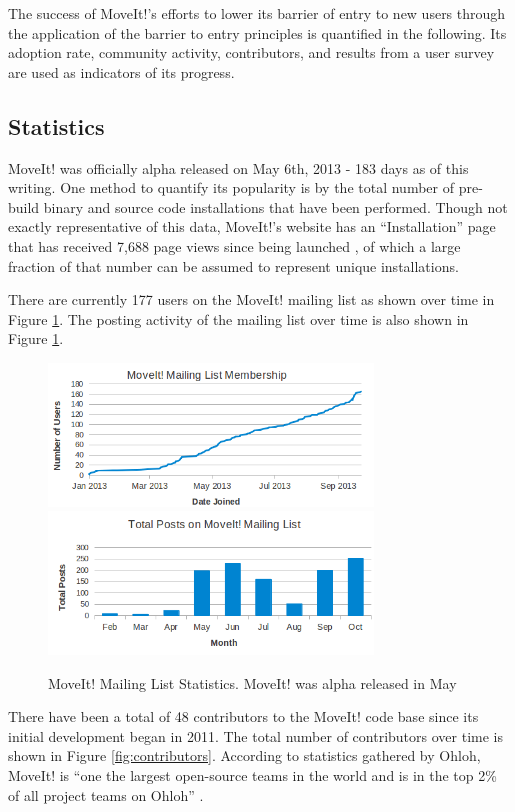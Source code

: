 \documentclass[10pt,journal,compsoc]{joser1}
\begin{document}
{The success of MoveIt!'s efforts to lower its barrier of entry to new users through the application of the barrier to entry principles is quantified in the following. Its adoption rate, community activity, contributors, and results from a user survey are used as indicators of its progress.

\subsection{Statistics}
\label{sec::statistics}

MoveIt! was officially alpha released on May 6th, 2013 - 183 days as of this writing. One method to quantify its popularity is by the total number of pre-build binary and source code installations that have been performed. Though not exactly representative of this data, MoveIt!'s website has an ``Installation'' page that has received 7,688 page views since being launched \cite{moveit}, of which a large fraction of that number can be assumed to represent unique installations. 

There are currently 177 users on the MoveIt! mailing list as shown over time in Figure \ref{fig:membership_plot}. The posting activity of the mailing list over time is also shown in Figure \ref{fig:membership_plot}.

\begin{figure}[!t]
\centering
\includegraphics[width=3.4in]{images/membership_plot}
\includegraphics[width=3.4in]{images/mailing_list}
\caption{MoveIt! Mailing List Statistics. MoveIt! was alpha released in May}
\label{fig:membership_plot}
\end{figure}

There have been a total of 48 contributors to the MoveIt! code base since its initial development began in 2011. The total number of contributors over time is shown in Figure \ref{fig:contributors}. According to statistics gathered by Ohloh, MoveIt! is ``one the largest open-source teams in the world and is in the top 2\% of all project teams on Ohloh'' \cite{ohloh}.

}
\end{document}
